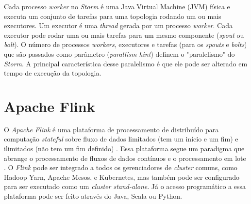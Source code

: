 Cada processo \emph{worker} no \emph{Storm} é uma Java Virtual Machine (JVM) física e executa um conjunto de tarefas para uma topologia rodando um ou mais executores. Um executor é uma \emph{thread} gerada por um processo \emph{worker}. Cada executor pode rodar uma ou mais tarefas para um mesmo componente (\emph{spout} ou \emph{bolt}). O número de processos \emph{workers}, executores e tarefas (para os \emph{spouts} e \emph{bolts}) que são passados como parâmetro (\emph{parallism hint}) definem o "paralelismo" do \emph{Storm}. A principal característica desse paralelismo é que ele pode ser alterado em tempo de execução da topologia.






\section{Apache Flink}
O \emph{Apache Flink} é uma plataforma de processamento de distribuído para computação \emph{stateful} sobre fluxo de dados limitados (tem um início e um fim) e ilimitados (não tem um fim definido) \cite{ApacheFlink2020}. Essa plataforma segue um paradigma que abrange o processamento de fluxos de dados contínuos e o processamento em lote \cite{Carbone2015,Lopez2018}.  O \emph{Flink} pode ser integrado a todos os gerenciadores de \emph{cluster} comuns, como Hadoop Yarn, Apache Mesos, e Kubernetes, mas também pode ser configurado para ser executado como um \emph{cluster stand-alone}. Já o acesso programático a essa plataforma pode ser feito através do Java, Scala ou Python.

